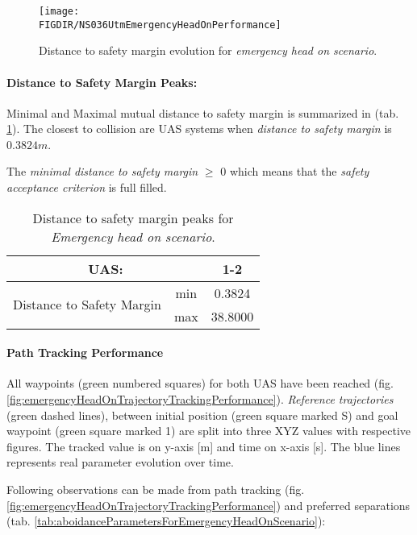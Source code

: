 \begin{figure}[H]
    \centering
    \texttt{[image: \\FIGDIR/NS036UtmEmergencyHeadOnPerformance]} 
    \caption{Distance to safety margin evolution for \emph{emergency head on scenario}.}
    \label{fig:testCaseHeadOnAvoidancePerformance}
\end{figure}


\paragraph{Distance to Safety Margin Peaks:} Minimal and Maximal mutual distance to safety margin is summarized in (tab. \ref{tab:testCaseEmergencyHeadOnSafetyMarginDistances}). The closest to collision are UAS systems  when \emph{distance to safety margin} is $0.3824 m$.

The \emph{minimal distance to safety margin} $\ge$ $0$ which means that the \emph{safety acceptance criterion} is full filled.


\begin{table}[H]
    \centering
    \begin{tabular}{c|c||c}
    \multicolumn{2}{c||}{UAS:} & 1-2 \\\hline\hline
    \multirow{2}{*}{Distance to Safety Margin} & min & 0.3824 \\\cline{2-3}
                                            & max & 38.8000 \\
    \end{tabular}
    \caption{Distance to safety margin peaks for \emph{Emergency head on scenario}.}
    \label{tab:testCaseEmergencyHeadOnSafetyMarginDistances}
\end{table}

\paragraph{Path Tracking Performance} All waypoints (green numbered squares) for both UAS have been reached (fig. \ref{fig:emergencyHeadOnTrajectoryTrackingPerformance}). \emph{Reference trajectories} (green dashed lines), between initial position (green square marked S) and goal waypoint (green square marked 1) are split into three XYZ values with respective figures. The tracked value is on y-axis [m] and time on x-axis [s]. The blue lines represents real parameter evolution over time.

Following observations can be made from path tracking (fig.\ref{fig:emergencyHeadOnTrajectoryTrackingPerformance}) and preferred separations (tab. \ref{tab:aboidanceParametersForEmergencyHeadOnScenario}):

